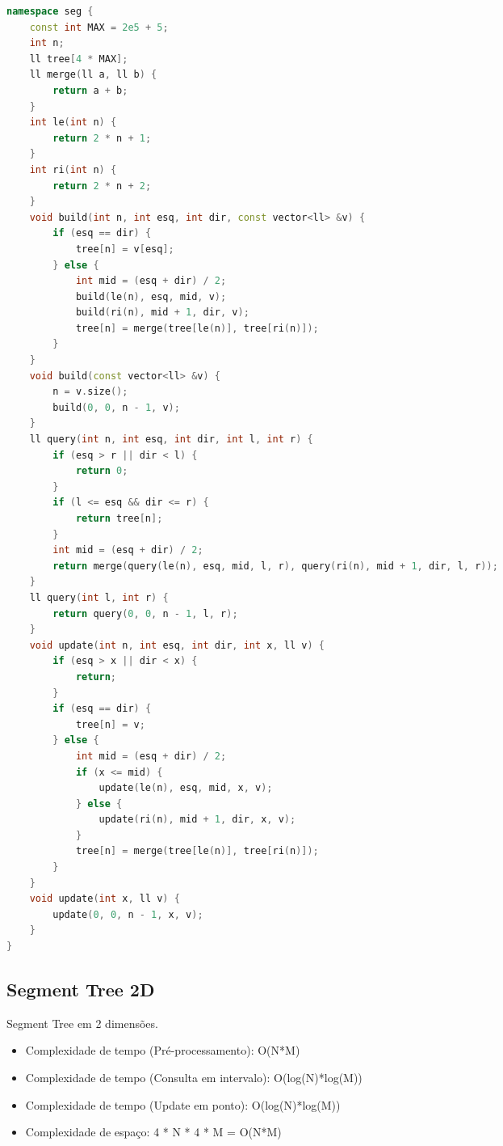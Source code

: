 \documentclass[11pt, a4paper, oneside]{book}
\begin{document}
\hfill

\begin{multicols}{2}
\begin{lstlisting}[language=C++]
namespace seg {
    const int MAX = 2e5 + 5;
    int n;
    ll tree[4 * MAX];
    ll merge(ll a, ll b) {
        return a + b;
    }
    int le(int n) {
        return 2 * n + 1;
    }
    int ri(int n) {
        return 2 * n + 2;
    }
    void build(int n, int esq, int dir, const vector<ll> &v) {
        if (esq == dir) {
            tree[n] = v[esq];
        } else {
            int mid = (esq + dir) / 2;
            build(le(n), esq, mid, v);
            build(ri(n), mid + 1, dir, v);
            tree[n] = merge(tree[le(n)], tree[ri(n)]);
        }
    }
    void build(const vector<ll> &v) {
        n = v.size();
        build(0, 0, n - 1, v);
    }
    ll query(int n, int esq, int dir, int l, int r) {
        if (esq > r || dir < l) {
            return 0;
        }
        if (l <= esq && dir <= r) {
            return tree[n];
        }
        int mid = (esq + dir) / 2;
        return merge(query(le(n), esq, mid, l, r), query(ri(n), mid + 1, dir, l, r));
    }
    ll query(int l, int r) {
        return query(0, 0, n - 1, l, r);
    }
    void update(int n, int esq, int dir, int x, ll v) {
        if (esq > x || dir < x) {
            return;
        }
        if (esq == dir) {
            tree[n] = v;
        } else {
            int mid = (esq + dir) / 2;
            if (x <= mid) {
                update(le(n), esq, mid, x, v);
            } else {
                update(ri(n), mid + 1, dir, x, v);
            }
            tree[n] = merge(tree[le(n)], tree[ri(n)]);
        }
    }
    void update(int x, ll v) {
        update(0, 0, n - 1, x, v);
    }
}
\end{lstlisting}
\end{multicols}

\hfill

\subsection{Segment Tree 2D}


Segment Tree em 2 dimensões.



\begin{itemize}
\item Complexidade de tempo (Pré-processamento): O(N*M)
\item Complexidade de tempo (Consulta em intervalo): O(log(N)*log(M))
\item Complexidade de tempo (Update em ponto): O(log(N)*log(M))
\item Complexidade de espaço: 4 * N * 4 * M = O(N*M)
\end{itemize}
\end{document}
